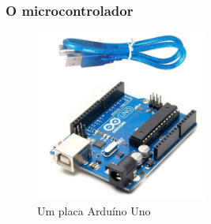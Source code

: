 \documentclass{beamer}
\begin{document}
	
	\begin{frame}
		\frametitle{O microcontrolador}
		\begin{figure}[htb]
					\includegraphics[width=0.5\textwidth]{img/arduino.jpg}
					\caption{Um placa Arduíno Uno}
				\end{figure}
	\end{frame}
	
\end{document}
